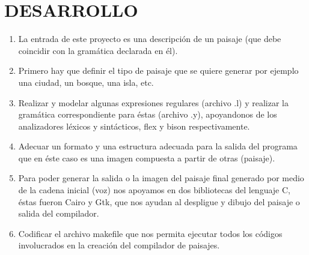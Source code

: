 \documentclass{article}
\begin{document}
\section{DESARROLLO}

\begin{enumerate}
\item La entrada de este proyecto es una descripción de un paisaje (que debe coincidir con la gramática declarada en él).\\
\item Primero hay que definir el tipo de paisaje que se quiere generar por ejemplo una ciudad, un bosque, una isla, etc.\\
\item Realizar y modelar algunas expresiones regulares (archivo .l) y realizar la gramática correspondiente para éstas (archivo .y), apoyandonos de los analizadores léxicos y sintácticos, flex y bison respectivamente.\\
\item Adecuar un formato y una estructura adecuada para la salida del programa que en éste caso es una imagen compuesta a partir de otras (paisaje).
\item Para poder generar la salida o la imagen del paisaje final generado por medio de la cadena inicial (voz) nos apoyamos en dos bibliotecas del lenguaje C, éstas fueron Cairo y Gtk, que nos ayudan al despligue y dibujo del paisaje o salida del compilador.
\item Codificar el archivo makefile que nos permita ejecutar todos los códigos involucrados en la creación del compilador de paisajes.\\ 
\end{enumerate}
\end{document}
